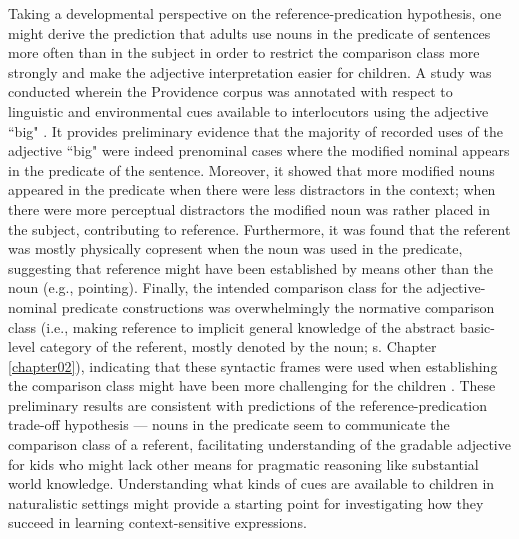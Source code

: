 Taking a developmental perspective on the reference-predication hypothesis, one might derive the prediction that adults use nouns in the predicate of sentences more often than in the subject in order to restrict the comparison class more strongly and make the adjective interpretation easier for children. A study was conducted wherein the Providence corpus was annotated with respect to linguistic and environmental cues available to interlocutors using the adjective ``big" \parencite{sinelnikova2020}. It provides preliminary evidence that the majority of recorded uses of the adjective ``big" were indeed prenominal cases where the modified nominal appears in the predicate of the sentence. 
Moreover, it showed that more modified nouns appeared in the predicate when there were less distractors in the context; when there were more perceptual distractors the modified noun was rather placed in the subject, contributing to reference. Furthermore, it was found that the referent was mostly physically copresent when the noun was used in the predicate, suggesting that reference might have been established by means other than the noun (e.g., pointing). Finally, the intended comparison class for the adjective-nominal predicate constructions was overwhelmingly the normative comparison class (i.e., making reference to implicit general knowledge of the abstract basic-level  category of the referent, mostly denoted by the noun; s. Chapter \ref{chapter02}), indicating that these syntactic frames were used when establishing the comparison class might have been more challenging for the children \parencite{sinelnikova2020}. These preliminary results are consistent with predictions of the reference-predication trade-off hypothesis ---  nouns in the predicate seem to communicate the comparison class of a referent, facilitating understanding of the gradable adjective for kids who might lack other means for pragmatic reasoning like substantial world knowledge. Understanding what kinds of cues are available to children in naturalistic settings might provide a starting point for investigating how they succeed in learning context-sensitive expressions. 



